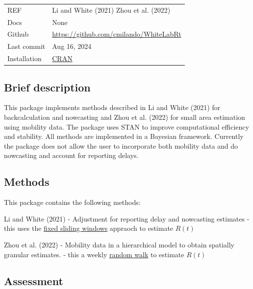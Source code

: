 \documentclass[
  letterpaper,
  DIV=11,
  numbers=noendperiod]{scrreprt}
\begin{document}

\begin{longtable}[]{@{}
  >{\raggedright\arraybackslash}p{}
  >{\raggedright\arraybackslash}p{}@{}}
\toprule\noalign{}
\endhead
\bottomrule\noalign{}
\endlastfoot
REF & Li and White (2021) Zhou et al. (2022) \\
Docs & None \\
Github & \url{https://github.com/cmilando/WhiteLabRt} \\
Last commit & Aug 16, 2024 \\
Installation &
\href{https://cran.r-project.org/web/packages/WhiteLabRt/index.html}{CRAN} \\
\end{longtable}

\subsection*{Brief description}\label{brief-description-14}

This package implements methods described in Li and White (2021) for
backcalculation and nowcasting and Zhou et al. (2022) for small area
estimation using mobility data. The package uses STAN to improve
computational efficiency and stability. All methods are implemented in a
Bayesian framework. Currently the package does not allow the user to
incorporate both mobility data and do nowcasting and account for
reporting delays.

\subsection*{Methods}\label{methods-14}

This package contains the following methods:

Li and White (2021) - Adjustment for reporting delay and nowcasting
estimates - this uses the \hyperref[sec-fixedwindow]{fixed sliding
windows} appraoch to estimate \(R(t)\)

Zhou et al. (2022) - Mobility data in a hierarchical model to obtain
spatially granular estimates. - this a weekly
\hyperref[sec-randomwalk]{random walk} to estimate \(R(t)\)

\subsection*{Assessment}\label{assessment-14}
\end{document}
